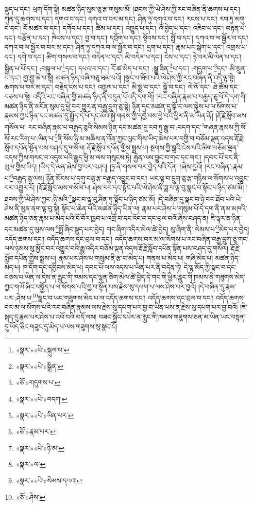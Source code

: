 སྡུད་པ་དང་། ཕྲག་དོག་སྟེ། མཚན་ཉིད་སུམ་ཅུ་རྩ་གསུམ་མོ། །ཐབས་ཀྱི་ཡེ་ཤེས་ཀྱི་རང་བཞིན་ནི་ཆགས་པ་དང་། ཀུན་དུ་ཆགས་པ་དང་། དགའ་བ་དང་། དགའ་བ་བར་མ་དང་། ཤིན་ཏུ་དགའ་བ་དང་། རངས་པ་དང་། རབ་ཏུ་མགུ་བ་དང་། ངོ་མཚར་བ་དང་། དགོད་པ་དང་། ཚིམ་པ་དང་། འཁྱུད་པ་དང་། འོ་བྱེད་པ་དང་། འཇིབ་པ་དང་། བརྟན་པ་དང་། བརྩོན་པ་དང་། ཁེངས་པ་དང་། བྱ་བ་དང་། དབྲོག་པ་དང་། སྟོབས་དང་། སྤྲོ་བ་དང་། དཀའ་བ་ལ་སྦྱོར་བ་དང་། དཀའ་བ་ལ་སྦྱོར་བ་བར་མ་དང་། ཤིན་ཏུ་དཀའ་བ་ལ་སྦྱོར་བ་དང་། དྲག་པ་དང་། རྣམ་པར་སྒེག་པ་དང་། འགྲས་པ་དང་། དགེ་བ་དང་། ཚིག་གསལ་བ་དང་། བདེན་པ་དང་། མི་བདེན་པ་དང་། ངེས་པ་དང་། ཉེ་བར་མི་ལེན་པ་དང་། སྦྱིན་པ་པོ་དང་། :བསྐུལ་པ་\footnote{«སྣར་»«པེ་»སྐུལ་པ་}དང་། དཔའ་བ་དང་། ངོ་ཚ་མེད་པ་དང་། :སྒྱུ་ཟིན་\footnote{«སྣར་»«པེ་»སྒྲིན་}པ་དང་། :གདུག་པ་\footnote{«ཅོ་»གདུགས་པ་}དང་། མི་སྲུན་པ་དང་། གྱ་གྱུ་ཆེ་བ་སྟེ། མཚན་ཉིད་བཞི་བཅུ་ཐམ་པའོ། །སྣང་བ་ཐོབ་པའི་ཡེ་ཤེས་ཀྱི་རང་བཞིན་ནི་འདི་ལྟ་སྟེ། ཆགས་པ་བར་མ་དང་། བརྗེད་ངས་པ་དང་། འཁྲུལ་པ་དང་། མི་སྨྲ་བ་དང་། སྐྱོ་བ་དང་། ལེ་ལོ་དང་། ཐེ་ཚོམ་དང་བཅས་པ་སྟེ། འདིའི་རང་བཞིན་གྱི་མཚན་ཉིད་ནི་བདུན་པོ་འདི་དག་གོ། །རང་བཞིན་རྣམ་པ་བརྒྱད་ཅུ་པོ་དེ་དག་གི་མཚན་ཉིད་ནི་མངོན་སུམ་དུ་ཕྱེ་བར་གྱུར་ན་བརྒྱ་དྲུག་ཅུ་སྟེ། ཉིན་དང་མཚན་དུ་སྒོ་ང་ལས་སྐྱེས་པ་ལ་སོགས་པ་རྣམས་ཀྱང་ཉིན་དང་མཚན་དུ་སྤྱོད་དེ་ཕོ་དང་མོའི་སྐྱེ་གནས་ཀྱི་དབྱེ་བས་ཕྱེ་བའི་ཕྱིར་ནི་མ་ཡིན་ནོ། །རྡོ་རྗེ་སློབ་མས་གསོལ་པ། རང་བཞིན་རྣམ་པ་བརྒྱད་ཅུའི་སེམས་ཉིན་དང་མཚན་དུ་རབ་ཏུ་རྒྱུ་བ་:བདག་དང་\footnote{«སྣར་»«པེ་»བདག་}གཞན་རྣམས་ཀྱི་སོ་སོ་རང་རིག་པ་:ཡིན་པ་\footnote{«སྣར་»«པེ་»ཡིན་པར་}ནི་སོམ་ཉི་མ་མཆིས་ན་འོན་ཀྱང་ལུང་གིས་ཡིད་ཆེས་པར་བགྱི་བ་བཅོམ་ལྡན་འདས་རྡོ་རྗེ་སློབ་དཔོན་སྟོན་པས་བཤད་དུ་གསོལ། རྡོ་རྗེ་སློབ་དཔོན་གྱིས་སྨྲས་པ། སྔགས་ཀྱི་སྒྲའི་ངེས་པའི་ཚིག་བཅོམ་ལྡན་འདས་ཀྱིས་གསང་བ་འདུས་པའི་རྒྱུད་ཕྱི་མ་ལས་གསུངས་ཏེ། རྐྱེན་ལས་བྱུང་བ་གང་དང་གང་། །དབང་པོ་དང་ནི་ཡུལ་གྱིས་ཡིད། །ཡིད་དེ་མན་ཞེས་བྱ་བར་བཤད། །ཏྲ་ནི་གསལ་བར་བྱེད་པའི་དོན། །ཞེས་བྱའོ། །རང་བཞིན་:རྣམ་པ་\footnote{«ཅོ་»རྣམ་པར་}བརྒྱད་ཅུ་ལས། ཉོན་མོངས་པ་དགུ་བཅུ་རྩ་བརྒྱད་འབྱུང་བ་དང་། ཡང་ལྟ་བ་དྲུག་ཅུ་རྩ་གཉིས་ལ་སོགས་པ་འབྱུང་བར་འགྱུར་རོ། །རྡོ་རྗེ་སློབ་མས་གསོལ་པ། ཤེས་རབ་དང་སྟོང་པའི་ཡེ་ཤེས་ནི་ཟླ་བ་ལྟ་བུ་སྣང་བ་སྟོང་པ་ཉིད་ཙམ་མོ། །ཐབས་ཀྱི་ཡེ་ཤེས་ཀྱང་:ཉི་མའི་\footnote{«སྣར་»«པེ་»ཉི་མ་}སྣང་བ་ལྟ་བུ་ཤིན་ཏུ་སྟོང་པ་ཉིད་ཙམ་མོ། །དེ་བཞིན་དུ་སྣང་བ་ཉེ་བར་ཐོབ་པའི་ཡེ་ཤེས་ནི་མུན་ནག་ལྟ་བུ་སྟེ། སྟོང་པ་ཆེན་པོའི་མཚན་ཉིད་ཡིན་ལ། རྣམ་པར་ཤེས་པ་གསུམ་པོ་དེ་དག་ནི་ནམ་མཁའི་མཚན་ཉིད་ཅན་རྣམ་པ་མེད་པའི་ངོ་བོར་ཁྱབ་པ་འགྲོ་བ་དང་འོང་བ་དང་བྲལ་བའོ་ཞེས་བཤད་ན། ཇི་ལྟར་ན་ཉིན་དང་མཚན་དུ་ལུས་ལས་\footnote{«སྣར་»ལ་}སྤྲོ་ཞིང་སྡུད་པར་བྱེད། གང་ཞིག་འདིར་མེལ་ཚེ་བྱེད། སུ་ཞིག་ནི་:སེམས་པ་\footnote{«སྣར་»«པེ་»སེམས་དཔའ་}མེད་པར་བྱེད། འདོད་ཆགས་དང་། འདོད་ཆགས་དང་བྲལ་བ་དང་། འདོད་ཆགས་བར་མ་ལ་སོགས་པ་རང་བཞིན་བརྒྱ་དྲུག་ཅུ་གང་ལས་ཉམས་སུ་མྱོང་བར་འགྱུར་བའི་རྒྱུ་འདིར་བཅོམ་ལྡན་འདས་རྡོ་རྗེ་སློབ་དཔོན་སྟོན་པས་བཤད་དུ་གསོལ། རྡོ་རྗེ་སློབ་དཔོན་གྱིས་སྨྲས་པ། རྣམ་པར་ཤེས་པ་གསུམ་ནི་རྩ་བ་མེད་པ། གནས་པ་མེད་པ། གཞི་མེད་པ། མཚན་ཉིད་མེད་པ། ཁ་དོག་དང་དབྱིབས་མེད་པ། དབང་པོ་ལས་འདས་པ་ཡིན་པར་ནི་བདེན་ཏེ། དེ་ལྟ་མོད་ཀྱི་སྣང་བ་དང་བཅས་པ་ཡིན་ལ་དེས་ན་རླུང་གི་ཁམས་དང་ལྷན་ཅིག་མེལ་ཚེ་བྱེད་དེ་གང་གི་ཕྱིར་རླུང་གི་ཁམས་ནི་གཟུགས་མེད་ཀྱང་གཡོ་ཞིང་བསྐྱོད་པ་ལ་སོགས་པའི་བྱ་བ་སྟོན་པས་རྗེས་སུ་དཔག་པ་ལས་ཤེས་པར་བྱའོ། །དེ་བཞིན་དུ་རྣམ་པར་:ཤེས་པ་\footnote{«ཅོ་»ཤེས་}སྣང་བ་ཡང་གཟུགས་མེད་པ་ལ་འདོད་ཆགས་དང་། འདོད་ཆགས་དང་བྲལ་བ་དང་། འདོད་ཆགས་བར་མ་ལ་སོགས་པའི་རང་བཞིན་རྣམས་ལས་རྗེས་སུ་དཔག་པར་བྱ་བ་ཡིན་པས་ན་རྗེས་སུ་དཔག་པར་བྱ་བའོ། །ཇི་སྐད་དུ་རྣམ་པར་ཤེས་པ་འཕོ་བའི་མདོ་ལས། བཟང་སྐྱོང་དཔེར་ན་རླུང་གི་ཁམས་གཟུགས་ཅན་མ་ཡིན་ཡང་བསྟན་དུ་ཡོད་ཅིང་གཟུང་དུ་མེད་པ་ལས་གཟུགས་སུ་སྣང་ངོ། 
